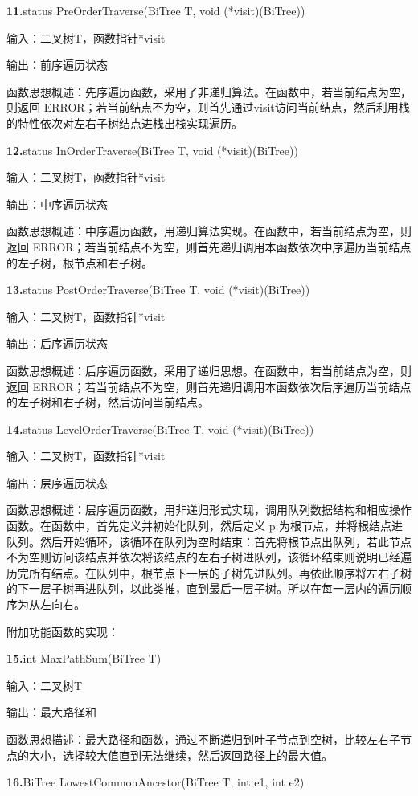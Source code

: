 \documentclass[supercite]{Experimental_Report}
\theoremstyle{definition}
\begin{document}
\noindent\textbf{11.}status PreOrderTraverse(BiTree T, void (*visit)(BiTree))

输入：二叉树T，函数指针*visit

输出：前序遍历状态

函数思想概述：先序遍历函数，采用了非递归算法。在函数中，若当前结点为空，则返回 ERROR；若当前结点不为空，则首先通过visit访问当前结点，然后利用栈的特性依次对左右子树结点进栈出栈实现遍历。

\noindent\textbf{12.}status InOrderTraverse(BiTree T, void (*visit)(BiTree))

输入：二叉树T，函数指针*visit

输出：中序遍历状态

函数思想概述：中序遍历函数，用递归算法实现。在函数中，若当前结点为空，则返回 ERROR；若当前结点不为空，则首先递归调用本函数依次中序遍历当前结点的左子树，根节点和右子树。

\noindent\textbf{13.}status PostOrderTraverse(BiTree T, void (*visit)(BiTree))

输入：二叉树T，函数指针*visit

输出：后序遍历状态

函数思想概述：后序遍历函数，采用了递归思想。在函数中，若当前结点为空，则返回 ERROR；若当前结点不为空，则首先递归调用本函数依次后序遍历当前结点的左子树和右子树，然后访问当前结点。

\noindent\textbf{14.}status LevelOrderTraverse(BiTree T, void (*visit)(BiTree))

输入：二叉树T，函数指针*visit

输出：层序遍历状态

函数思想概述：层序遍历函数，用非递归形式实现，调用队列数据结构和相应操作函数。在函数中，首先定义并初始化队列，然后定义 p 为根节点，并将根结点进队列。然后开始循环，该循环在队列为空时结束：首先将根节点出队列，若此节点不为空则访问该结点并依次将该结点的左右子树进队列，该循环结束则说明已经遍历完所有结点。在队列中，根节点下一层的子树先进队列。再依此顺序将左右子树的下一层子树再进队列，以此类推，直到最后一层子树。所以在每一层内的遍历顺序为从左向右。

附加功能函数的实现：

\noindent\textbf{15.}int MaxPathSum(BiTree T)

输入：二叉树T

输出：最大路径和

函数思想描述：最大路径和函数，通过不断递归到叶子节点到空树，比较左右子节点的大小，选择较大值直到无法继续，然后返回路径上的最大值。

\noindent\textbf{16.}BiTree LowestCommonAncestor(BiTree T, int e1, int e2)
\end{document}
